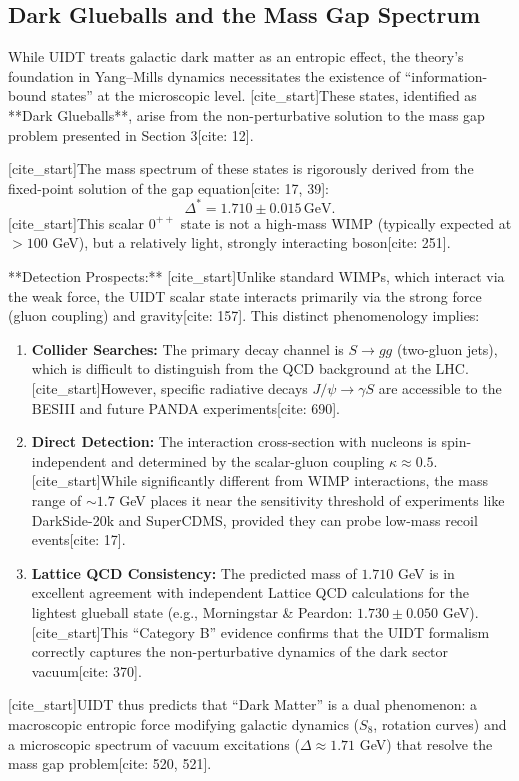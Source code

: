 \subsection{Dark Glueballs and the Mass Gap Spectrum}
\label{subsec:dark_glueballs}

While UIDT treats galactic dark matter as an entropic effect, the theory's foundation in Yang--Mills dynamics necessitates the existence of ``information-bound states'' at the microscopic level. [cite_start]These states, identified as **Dark Glueballs**, arise from the non-perturbative solution to the mass gap problem presented in Section 3[cite: 12].

[cite_start]The mass spectrum of these states is rigorously derived from the fixed-point solution of the gap equation[cite: 17, 39]:
\begin{equation}
\label{eq:mass_gap_solution}
\Delta^* = 1.710 \pm 0.015\,\mathrm{GeV}.
\end{equation}
[cite_start]This scalar $0^{++}$ state is not a high-mass WIMP (typically expected at $>100$ GeV), but a relatively light, strongly interacting boson[cite: 251].

**Detection Prospects:**
[cite_start]Unlike standard WIMPs, which interact via the weak force, the UIDT scalar state interacts primarily via the strong force (gluon coupling) and gravity[cite: 157]. This distinct phenomenology implies:
\begin{enumerate}
    \item \textbf{Collider Searches:} The primary decay channel is $S \to gg$ (two-gluon jets), which is difficult to distinguish from the QCD background at the LHC. [cite_start]However, specific radiative decays $J/\psi \to \gamma S$ are accessible to the BESIII and future PANDA experiments[cite: 690].
    \item \textbf{Direct Detection:} The interaction cross-section with nucleons is spin-independent and determined by the scalar-gluon coupling $\kappa \approx 0.5$. [cite_start]While significantly different from WIMP interactions, the mass range of $\sim 1.7$ GeV places it near the sensitivity threshold of experiments like DarkSide-20k and SuperCDMS, provided they can probe low-mass recoil events[cite: 17].
    \item \textbf{Lattice QCD Consistency:} The predicted mass of $1.710$ GeV is in excellent agreement with independent Lattice QCD calculations for the lightest glueball state (e.g., Morningstar \& Peardon: $1.730 \pm 0.050$ GeV). [cite_start]This ``Category B'' evidence confirms that the UIDT formalism correctly captures the non-perturbative dynamics of the dark sector vacuum[cite: 370].
\end{enumerate}

[cite_start]UIDT thus predicts that ``Dark Matter'' is a dual phenomenon: a macroscopic entropic force modifying galactic dynamics ($S_8$, rotation curves) and a microscopic spectrum of vacuum excitations ($\Delta \approx 1.71$ GeV) that resolve the mass gap problem[cite: 520, 521].